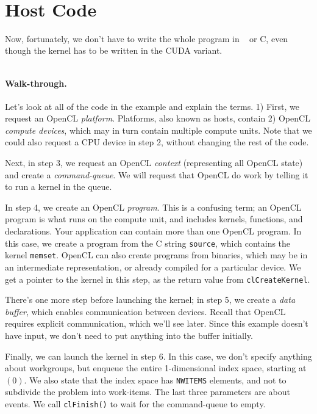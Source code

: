 \begin{lstlisting}
                                              
\end{lstlisting}


\section*{Host Code}
Now, fortunately, we don't have to write the whole program in \CPP~ or C, even though the kernel has to be written in the CUDA variant. 

\begin{lstlisting}[language=Rust]
\end{lstlisting}

\paragraph{Walk-through.} Let's look at all of the code in the example and
explain the terms. 1) First, we request an OpenCL \emph{platform}.
Platforms, also known as hosts, contain 2) OpenCL \emph{compute devices},
which may in turn contain multiple compute units. Note that we could
also request a CPU device in step 2, without changing the rest of the code.

Next, in step 3, we request an OpenCL \emph{context} (representing all
OpenCL state) and create a \emph{command-queue}. We will request that
OpenCL do work by telling it to run a kernel in the queue.

In step 4, we create an OpenCL \emph{program}. This is a confusing
term; an OpenCL program is what runs on the compute unit, and includes
kernels, functions, and declarations. Your application can contain
more than one OpenCL program. In this case, we create a program
from the C string {\tt source}, which contains the kernel
{\tt memset}. OpenCL can also create programs from binaries, which may be
in an intermediate representation, or already compiled for a particular
device. We get a pointer to the kernel in this step, as the return
value from {\tt clCreateKernel}.

There's one more step before launching the kernel; in step 5, we
create a \emph{data buffer}, which enables communication between
devices. Recall that OpenCL requires explicit communication,
which we'll see later. Since this example doesn't have input, we 
don't need to put anything into the buffer initially.

Finally, we can launch the kernel in step 6. In this case, we don't
specify anything about workgroups, but enqueue the entire
1-dimensional index space, starting at $(0)$. We also state that the
index space has {\tt NWITEMS} elements, and not to subdivide the
problem into work-items. The last three parameters are about events.
We call {\tt clFinish()} to wait for the command-queue to empty.

